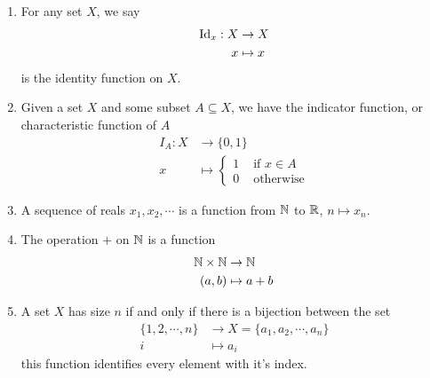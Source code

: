 \documentclass{article}
\begin{document}
\begin{eg}\leavevmode
    \begin{enumerate}
        \item For any set $X$, we say 
        \begin{align*}
            \mathrm{Id}_x: X &\rightarrow X \\
            x &\mapsto x
        \end{align*}
        is the identity function on $X$.

        \item Given a set $X$ and some subset $A \subseteq X$, we have the indicator function, or characteristic function of $A$
        \begin{align*}
            I_A : X &\rightarrow \{0, 1\} \\
            x &\mapsto \begin{cases}
                1 & \text{ if } x \in A \\
                0 & \text{ otherwise}
            \end{cases}
        \end{align*}

        \item A sequence of reals $x_1, x_2, \cdots$ is a function from $\mathbb{N}$ to $\mathbb{R}$, $n \mapsto x_n$.
        \item The operation $+$ on $\mathbb{N}$ is a function
        \begin{align*}
            \mathbb{N} \times \mathbb{N} &\rightarrow \mathbb{N} \\
            (a , b) &\mapsto a + b
        \end{align*}

        \item A set $X$ has size $n$ if and only if there is a bijection between the set
        \begin{align*}
            \{1, 2, \cdots, n\} &\rightarrow X = \{a_1, a_2, \cdots, a_n\} \\
            i &\mapsto a_i
        \end{align*}
        this function identifies every element with it's index.
    \end{enumerate}
\end{eg}
\end{document}
